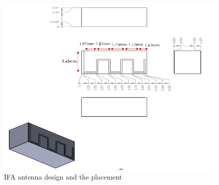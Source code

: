 \begin{figure}[h]
	\centering
	\includegraphics[width=1\textwidth]{Chap03/Figures/IFA_antenna.PNG}
	\caption{IFA antenna design and the placement}
	\label{fig:IFA_Antenna_1}
\end{figure}

